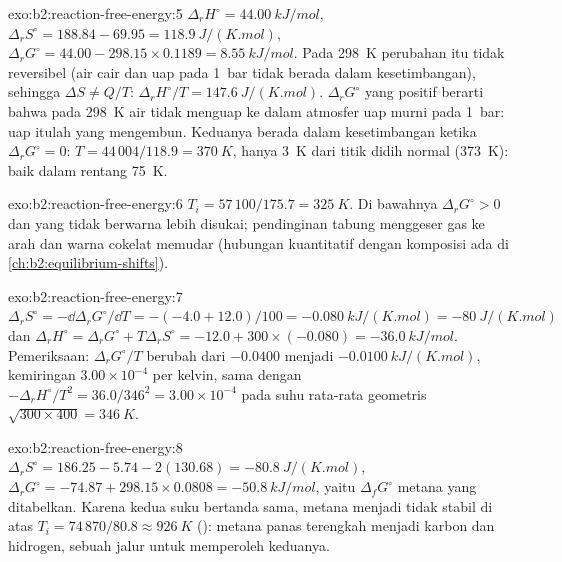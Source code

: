 \begin{solution}{exo:b2:reaction-free-energy:5}
$\Delta_r H^\circ = \qty{44.00}{kJ/mol}$, $\Delta_r S^\circ = 188.84 - 69.95 =
\qty{118.9}{J/(K.mol)}$, $\Delta_r G^\circ = 44.00 - 298.15 \times 0.1189 =
\qty{+8.55}{kJ/mol}$. Pada \qty{298}{K} perubahan itu tidak reversibel (air
cair dan uap pada \qty{1}{bar} tidak berada dalam kesetimbangan), sehingga
$\Delta S \ne
Q/T$: $\Delta_r H^\circ/T = \qty{147.6}{J/(K.mol)}$.
$\Delta_r G^\circ$ yang positif berarti bahwa pada \qty{298}{K} air tidak
menguap ke dalam atmosfer uap murni pada \qty{1}{bar}: uap itulah yang
mengembun. Keduanya berada dalam kesetimbangan ketika $\Delta_r G^\circ = 0$:
$T = 44\,004/118.9 =
\qty{370}{K}$, hanya \qty{3}{K} dari titik didih
normal (\qty{373}{K}):  baik dalam rentang
\qty{75}{K}.
\end{solution}

\begin{solution}{exo:b2:reaction-free-energy:6}
$T_i = 57\,100/175.7 = \qty{325}{K}$. Di bawahnya $\Delta_r G^\circ > 0$
dan  yang tidak berwarna lebih disukai; pendinginan tabung
menggeser gas ke arah  dan warna cokelat  memudar
(hubungan kuantitatif dengan komposisi ada di
\cref{ch:b2:equilibrium-shifts}).
\end{solution}

\begin{solution}{exo:b2:reaction-free-energy:7}
$\Delta_r S^\circ = -\dd\Delta_r G^\circ/\dd T = -(-4.0 + 12.0)/100 =
\qty{-0.080}{kJ/(K.mol)} = \qty{-80}{J/(K.mol)}$ dan $\Delta_r H^\circ =
\Delta_r G^\circ + T\Delta_r S^\circ = -12.0 + 300 \times (-0.080) =
\qty{-36.0}{kJ/mol}$. Pemeriksaan: $\Delta_r G^\circ/T$ berubah dari
$-0.0400$ menjadi $\qty{-0.0100}{kJ/(K.mol)}$, kemiringan
$3.00 \times 10^{-4}$ per kelvin, sama dengan
$-\Delta_r H^\circ/T^2 = 36.0/346^2 = 3.00 \times 10^{-4}$ pada suhu rata-rata
geometris $\sqrt{300 \times 400} = \qty{346}{K}$.
\end{solution}

\begin{solution}{exo:b2:reaction-free-energy:8}
$\Delta_r S^\circ = 186.25 - 5.74 - 2(130.68) = \qty{-80.8}{J/(K.mol)}$,
$\Delta_r G^\circ = -74.87 + 298.15 \times 0.0808 = \qty{-50.8}{kJ/mol}$,
yaitu $\Delta_f G^\circ$ metana yang ditabelkan. Karena kedua suku bertanda
sama, metana menjadi tidak stabil di atas $T_i = 74\,870/80.8 \approx
\qty{926}{K}$ (): metana panas terengkah menjadi karbon
dan hidrogen, sebuah jalur untuk memperoleh keduanya.
\end{solution}

